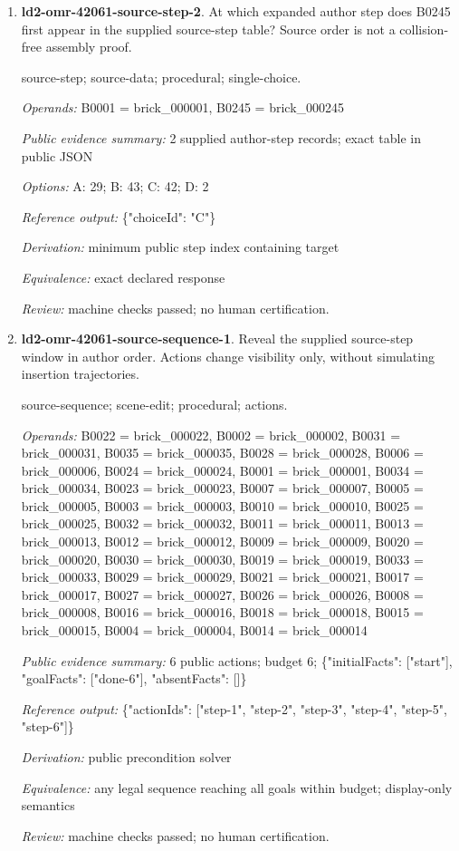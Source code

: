 \begin{enumerate}
\item \textbf{ld2-omr-42061-source-step-2}. At which expanded author step does B0245 first appear in the supplied source-step table? Source order is not a collision-free assembly proof.
\par{\small source-step; source-data; procedural; single-choice.\par\textit{Operands:} B0001 = brick\_000001, B0245 = brick\_000245\par\textit{Public evidence summary:} 2 supplied author-step records; exact table in public JSON\par\textit{Options:} A: 29; B: 43; C: 42; D: 2\par\textit{Reference output:} \{"choiceId": "C"\}\par\textit{Derivation:} minimum public step index containing target\par\textit{Equivalence:} exact declared response\par\textit{Review:} machine checks passed; no human certification.}
\item \textbf{ld2-omr-42061-source-sequence-1}. Reveal the supplied source-step window in author order. Actions change visibility only, without simulating insertion trajectories.
\par{\small source-sequence; scene-edit; procedural; actions.\par\textit{Operands:} B0022 = brick\_000022, B0002 = brick\_000002, B0031 = brick\_000031, B0035 = brick\_000035, B0028 = brick\_000028, B0006 = brick\_000006, B0024 = brick\_000024, B0001 = brick\_000001, B0034 = brick\_000034, B0023 = brick\_000023, B0007 = brick\_000007, B0005 = brick\_000005, B0003 = brick\_000003, B0010 = brick\_000010, B0025 = brick\_000025, B0032 = brick\_000032, B0011 = brick\_000011, B0013 = brick\_000013, B0012 = brick\_000012, B0009 = brick\_000009, B0020 = brick\_000020, B0030 = brick\_000030, B0019 = brick\_000019, B0033 = brick\_000033, B0029 = brick\_000029, B0021 = brick\_000021, B0017 = brick\_000017, B0027 = brick\_000027, B0026 = brick\_000026, B0008 = brick\_000008, B0016 = brick\_000016, B0018 = brick\_000018, B0015 = brick\_000015, B0004 = brick\_000004, B0014 = brick\_000014\par\textit{Public evidence summary:} 6 public actions; budget 6; \{"initialFacts": ["start"], "goalFacts": ["done-6"], "absentFacts": []\}\par\textit{Reference output:} \{"actionIds": ["step-1", "step-2", "step-3", "step-4", "step-5", "step-6"]\}\par\textit{Derivation:} public precondition solver\par\textit{Equivalence:} any legal sequence reaching all goals within budget; display-only semantics\par\textit{Review:} machine checks passed; no human certification.}

\end{enumerate}
